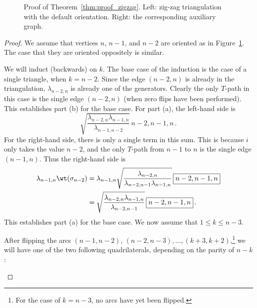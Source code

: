 \begin{figure}[h]\centering

\caption{Proof of Theorem~\ref{thm:proof_zigzag}.
{Left:} zig-zag triangulation with the default orientation.
{Right:} the corresponding auxiliary graph.}\label{fig:proof_zigzag}
\end{figure}

\begin{proof}
 We assume that vertices $n$, $n-1$, and $n-2$ are oriented as in Figure~\ref{fig:proof_zigzag}. The case that they are oriented oppositely is similar.

 We will induct (backwards) on $k$.
 The base case of the induction is the case of a single triangle, when $k=n-2$.
 Since the edge $(n-2,n)$ is already in the triangulation, $\lambda_{n-2,n}$ is already one of the generators. Clearly the only $T$-path
 in this case is the single edge $(n-2,n)$ (when zero flips have been performed). This establishes part (b) for the base case.
 For part (a), the left-hand side is
 \[ \sqrt{\frac{\lambda_{n-2,n}\lambda_{n-1,n}}{\lambda_{n-1,n-2}}} \, \boxed{n-2,n-1,n}\,. \]
 For the right-hand side, there is only a single term in this sum. This is because $i$ only takes the value $n-2$,
 and the only $T$-path from $n-1$ to $n$ is the single edge $(n-1,n)$. Thus the right-hand side is
 \begin{align*}
 \lambda_{n-1,n}   \wt(\sigma_{n-2}) &= \lambda_{n-1,n}   \sqrt{\frac{\lambda_{n-2,n}}{\lambda_{n-2,n-1}\lambda_{n-1,n}}} \, \boxed{n-2,n-1,n} \\
 &= \sqrt{\frac{\lambda_{n-2,n}\lambda_{n-1,n}}{\lambda_{n-2,n-1}}} \, \boxed{n-2,n-1,n}\,.
 \end{align*}
 This establishes part (a) for the base case. We now assume that $1 \leq k \leq n-3$.

 After flipping the arcs $(n-1,n-2)$, $(n-2,n-3), \dots, (k+3,k+2)$,\footnote{For the case of $k=n-3$, no arcs have yet been flipped.} we will have one of the two following quadrilaterals, depending on the parity of $n-k$:
 \begin {center}
 \end {center}



\end{proof}

